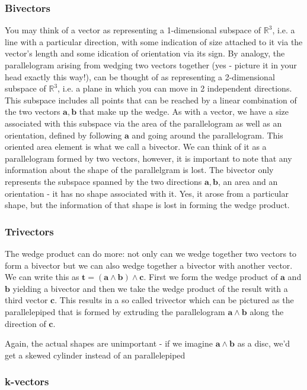 \subsubsection{Bivectors}
You may think of a vector as representing a 1-dimensional subspace of $\mathbb{R}^3$, i.e. a line with a particular direction, with some indication of size attached to it via the vector's length and some idication of orientation via its sign. By analogy, the parallelogram arising from wedging two vectors together (yes - picture it in your head exactly this way!), can be thought of as representing a 2-dimensional subspace of $\mathbb{R}^3$, i.e. a plane in which you can move in 2 independent directions. This subspace includes all points that can be reached by a linear combination of the two vectors $\mathbf{a,b}$ that make up the wedge. As with a vector, we have a size associated with this subspace via the area of the parallelogram as well as an orientation, defined by following $\mathbf{a}$ and going around the parallelogram. This oriented area element is what we call a bivector. We can think of it as a parallelogram formed by two vectors, however, it is important to note that any information about the shape of the parallelgram is lost. The bivector only represents the subspace spanned by the two directions $\mathbf{a,b}$, an area and an orientation - it has no shape associated with it. Yes, it arose from a particular shape, but the information of that shape is lost in forming the wedge product.

\subsubsection{Trivectors}
The wedge product can do more: not only can we wedge together two vectors to form a bivector but we can also wedge together a bivector with another vector. We can write this as $\mathbf{t = (a \wedge b) \wedge c}$. First we form the wedge product of $\mathbf{a}$ and  $\mathbf{b}$ yielding a bivector and then we take the wedge product of the result with a third vector $\mathbf{c}$. This results in a so called trivector which can be pictured as the parallelepiped that is formed by extruding the parallelogram $\mathbf{a \wedge b}$ along the direction of $\mathbf{c}$. 

Again, the actual shapes are unimportant - if we imagine $\mathbf{a \wedge b}$ as a disc, we'd get a skewed cylinder instead of an parallelepiped

\subsubsection{k-vectors}

